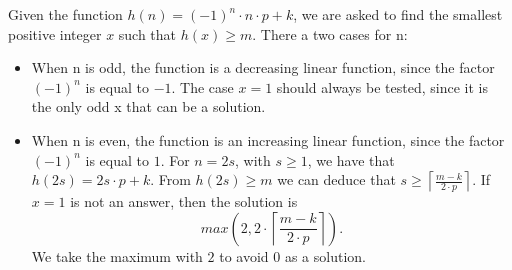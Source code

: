 % 

Given the function $h(n)=(-1)^n \cdot n \cdot p + k$, we are asked to find the smallest positive integer $x$ such that $h(x) \ge m$. There a two cases for n:
\begin{itemize}
\item When n is odd, the function is a decreasing linear function, since the factor $(-1)^n$ is equal to $-1$. The case $x = 1$ should always be tested, since it is the only odd x that can be a solution.

\item When n is even, the function is an increasing linear function, since the factor $(-1)^n$ is equal to $1$. For $n=2s$, with $s\geq1$, we have that $h(2s) = 2s \cdot p + k$. From $h(2s) \ge m$ we can deduce that $s \ge \left \lceil \frac{m-k}{2 \cdot p} \right \rceil$. If $x = 1$ is not an answer, then the solution is $$max(2, 2 \cdot \left \lceil \frac{m-k}{2 \cdot p} \right \rceil).$$ We take the maximum with $2$ to avoid $0$ as a solution.
\end{itemize}

